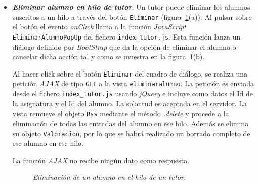 \documentclass[a4paper, 12pt]{book}
\begin{document}
\begin{itemize}
  
  \item {\bfseries \textit{Eliminar alumno en hilo de tutor}}: Un tutor puede eliminar los alumnos suscritos a un hilo a trav\'es del 
  bot\'on \texttt{Eliminar} (figura~\ref{fig:eliminaralumno}(a)). Al pulsar sobre el bot\'on el evento \textit{onClick} llama a la funci\'on 
  \textit{JavaScript} \texttt{EliminarAlumnoPopUp} del fichero \texttt{index\_tutor.js}. Esta funci\'on lanza un di\'alogo definido por \textit{BootStrap} 
  que da la opci\'on de eliminar el alumno o cancelar dicha acci\'on tal y como se muestra en la figura~\ref{fig:eliminaralumno}(b). 
  
  Al hacer click sobre el bot\'on \texttt{Eliminar} del cuadro de di\'alogo, se realiza una petici\'on \textit{AJAX} de tipo \texttt{GET} a la vista 
  \texttt{eliminaralumno}. La petici\'on es enviada desde el fichero \texttt{index\_tutor.js} usando \textit{jQuery} e incluye como datos el 
  Id de la asignatura y el Id del alumno. La solicitud es aceptada en el servidor. La vista remueve el objeto \texttt{Rss} mediante el m\'etodo 
  \textit{.delete} y procede a la eliminaci\'on de todas las entradas del alumno en ese hilo. Adem\'as se elimina su objeto \texttt{Valoracion},
  por lo que se habr\'a realizado un borrado completo de ese alumno en ese hilo.
  
  La funci\'on \textit{AJAX} no recibe ning\'un dato como respuesta.
  
  \begin{figure}
    \centering
    \caption{\textit{Eliminaci\'on de un alumno en el hilo de un tutor.}}
    \label{fig:eliminaralumno}
  \end{figure}
  

\end{itemize}
\end{document}
